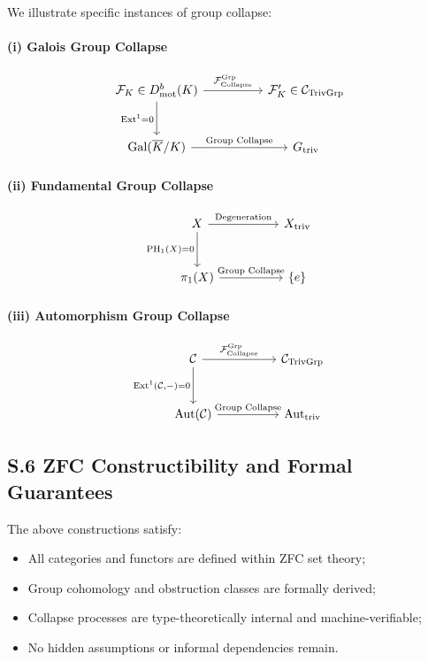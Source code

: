 \documentclass[11pt]{article}
\begin{document}
We illustrate specific instances of group collapse:

\paragraph{(i) Galois Group Collapse}

\[
\begin{tikzcd}[column sep=huge, row sep=large]
\mathcal{F}_K \in D^b_{\mathrm{mot}}(K) \arrow[r, "{\mathcal{F}_{\mathrm{Collapse}}^{\mathrm{Grp}}}"] \arrow[d, swap, "{\mathrm{Ext}^1 = 0}"]
& \mathcal{F}_K' \in \mathcal{C}_{\mathrm{TrivGrp}} \\
\mathrm{Gal}(\overline{K}/K) \arrow[r, "{\text{Group Collapse}}"]
& G_{\mathrm{triv}}
\end{tikzcd}
\]

\paragraph{(ii) Fundamental Group Collapse}

\[
\begin{tikzcd}[column sep=huge, row sep=large]
X \arrow[r, "{\mathrm{Degeneration}}"] \arrow[d, swap, "{\mathrm{PH}_1(X) = 0}"]
& X_{\mathrm{triv}} \\
\pi_1(X) \arrow[r, "{\text{Group Collapse}}"]
& \{e\}
\end{tikzcd}
\]

\paragraph{(iii) Automorphism Group Collapse}

\[
\begin{tikzcd}[column sep=huge, row sep=large]
\mathcal{C} \arrow[r, "{\mathcal{F}_{\mathrm{Collapse}}^{\mathrm{Grp}}}"] \arrow[d, swap, "{\mathrm{Ext}^1(\mathcal{C}, -) = 0}"]
& \mathcal{C}_{\mathrm{TrivGrp}} \\
\mathrm{Aut}(\mathcal{C}) \arrow[r, "{\text{Group Collapse}}"]
& \mathrm{Aut}_{\mathrm{triv}}
\end{tikzcd}
\]

\subsection*{S.6 ZFC Constructibility and Formal Guarantees}

The above constructions satisfy:

\begin{itemize}
    \item All categories and functors are defined within ZFC set theory;
    \item Group cohomology and obstruction classes are formally derived;
    \item Collapse processes are type-theoretically internal and machine-verifiable;
    \item No hidden assumptions or informal dependencies remain.
\end{itemize}
\end{document}
